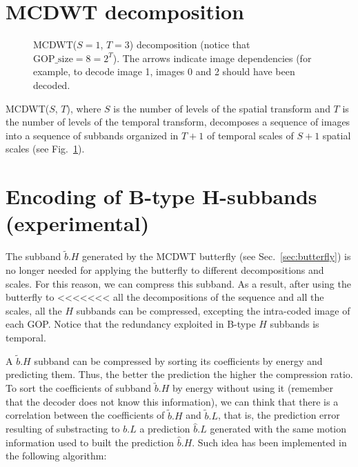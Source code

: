 
\section{MCDWT decomposition}

\begin{figure}
  \centering %
  \caption{MCDWT($S=1$, $T=3$) decomposition (notice that
    $\text{GOP\_size}=8=2^T$). The arrows indicate image dependencies
    (for example, to decode image 1, images 0 and 2 should have been
    decoded.} %
  \label{fig:MCDWT_decomposition}
\end{figure}

MCDWT($S$, $T$), where $S$ is the number of levels of the spatial
transform and $T$ is the number of levels of the temporal transform,
decomposes a sequence of images into a sequence of subbands organized
in $T+1$ of temporal scales of $S+1$ spatial scales (see
Fig.~\ref{fig:MCDWT_decomposition}).


\section{Encoding of B-type H-subbands (experimental)}

The subband $\tilde{b}.H$ generated by the MCDWT butterfly (see
Sec.~\ref{sec:butterfly}) is no longer needed for applying the
butterfly to different decompositions and scales. For this reason, we
can compress this subband. As a result, after using the butterfly to
<<<<<<< all the decompositions of the sequence and all the scales, all the $H$
subbands can be compressed, excepting the intra-coded image of each
GOP. Notice that the redundancy exploited in B-type $H$ subbands is
temporal.

A $\tilde{b}.H$ subband can be compressed by sorting its coefficients
by energy and predicting them. Thus, the better the prediction the
higher the compression ratio. To sort the coefficients of subband
$\tilde{b}.H$ by energy without using it (remember that the decoder
does not know this information), we can think that there is a
correlation between the coefficients of $\tilde{b}.H$ and
$\tilde{b}.L$, that is, the prediction error resulting of substracting
to $b.L$ a prediction $\hat{b}.L$ generated with the same motion
information used to built the prediction $\hat{b}.H$. Such idea has
been implemented in the following algorithm:

